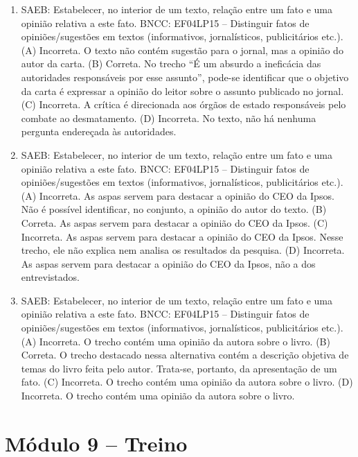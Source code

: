 \begin{enumerate}
\item
SAEB: Estabelecer, no interior de um texto, relação entre um fato e
uma opinião relativa a este fato.
BNCC: EF04LP15 -- Distinguir fatos de opiniões/sugestões em textos
(informativos, jornalísticos, publicitários etc.).
(A)  Incorreta. O texto não contém sugestão para o jornal, mas a
opinião do autor da carta.
(B)  Correta. No trecho ``É um absurdo a ineficácia das autoridades
responsáveis por esse assunto'', pode-se identificar que o objetivo da
carta é expressar a opinião do leitor sobre o assunto publicado no jornal.
(C)  Incorreta. A crítica é direcionada aos órgãos de estado responsáveis pelo combate ao desmatamento.
(D)  Incorreta. No texto, não há nenhuma pergunta endereçada às autoridades.

\item
SAEB: Estabelecer, no interior de um texto, relação entre um fato e
uma opinião relativa a este fato.
BNCC: EF04LP15 -- Distinguir fatos de opiniões/sugestões em textos
(informativos, jornalísticos, publicitários etc.).
(A) Incorreta. As aspas servem para destacar a opinião do CEO da Ipsos. 
Não é possível identificar, no conjunto, a opinião do autor do texto.  
(B) Correta. As aspas servem para destacar a opinião do CEO da Ipsos.
(C) Incorreta. As aspas servem para destacar a opinião do CEO da Ipsos.
Nesse trecho, ele não explica nem analisa os resultados da pesquisa.
(D) Incorreta. As aspas servem para destacar a opinião do CEO da Ipsos, não
a dos entrevistados.

\item
SAEB: Estabelecer, no interior de um texto, relação entre um fato e
uma opinião relativa a este fato.
BNCC: EF04LP15 -- Distinguir fatos de opiniões/sugestões em textos
(informativos, jornalísticos, publicitários etc.).
(A) Incorreta. O trecho contém uma opinião da autora sobre o livro.
(B) Correta. O trecho destacado nessa alternativa contém a descrição
objetiva de temas do livro feita pelo autor. Trata-se, portanto, da apresentação de 
um fato. 
(C) Incorreta. O trecho contém uma opinião da autora sobre o livro.
(D) Incorreta. O trecho contém uma opinião da autora sobre o livro.
\end{enumerate}

\section*{Módulo 9 – Treino}

